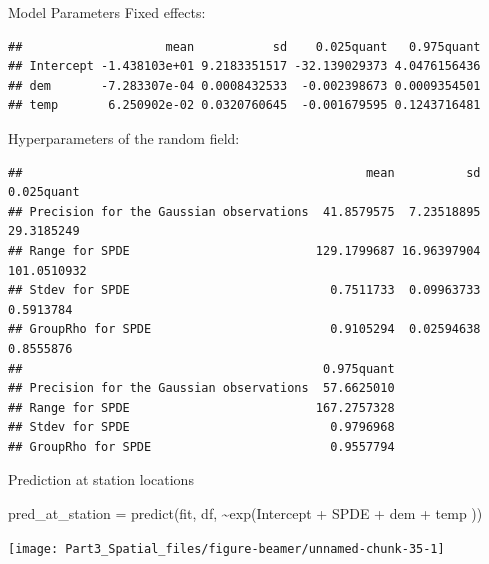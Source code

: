 \documentclass[
  ignorenonframetext,
]{beamer}
\newenvironment{Shaded}{\begin{snugshade}}{\end{snugshade}}
\newcommand{\FunctionTok}[1]{\textcolor[rgb]{0.00,0.00,0.00}{#1}}
\newcommand{\NormalTok}[1]{#1}
\newcommand{\OtherTok}[1]{\textcolor[rgb]{0.56,0.35,0.01}{#1}}
\newcommand{\SpecialCharTok}[1]{\textcolor[rgb]{0.00,0.00,0.00}{#1}}
\begin{document}
\begin{frame}[fragile]{Model Parameters}
\protect\hypertarget{model-parameters}{}
Fixed effects: \tiny

\begin{verbatim}
##                    mean           sd    0.025quant   0.975quant
## Intercept -1.438103e+01 9.2183351517 -32.139029373 4.0476156436
## dem       -7.283307e-04 0.0008432533  -0.002398673 0.0009354501
## temp       6.250902e-02 0.0320760645  -0.001679595 0.1243716481
\end{verbatim}

\normalsize

Hyperparameters of the random field: \tiny

\begin{verbatim}
##                                                mean          sd  0.025quant
## Precision for the Gaussian observations  41.8579575  7.23518895  29.3185249
## Range for SPDE                          129.1799687 16.96397904 101.0510932
## Stdev for SPDE                            0.7511733  0.09963733   0.5913784
## GroupRho for SPDE                         0.9105294  0.02594638   0.8555876
##                                          0.975quant
## Precision for the Gaussian observations  57.6625010
## Range for SPDE                          167.2757328
## Stdev for SPDE                            0.9796968
## GroupRho for SPDE                         0.9557794
\end{verbatim}
\end{frame}

\begin{frame}[fragile]{Prediction at station locations}
\protect\hypertarget{prediction-at-station-locations}{}
\small

\begin{Shaded}
\begin{Highlighting}[]
\NormalTok{pred\_at\_station }\OtherTok{=} \FunctionTok{predict}\NormalTok{(fit, df, }
                          \SpecialCharTok{\textasciitilde{}}\FunctionTok{exp}\NormalTok{(Intercept }\SpecialCharTok{+}\NormalTok{ SPDE }\SpecialCharTok{+}\NormalTok{ dem }\SpecialCharTok{+}\NormalTok{ temp ))}
\end{Highlighting}
\end{Shaded}

\normalsize

\begin{center}\texttt{[image: Part3\_Spatial\_files/figure-beamer/unnamed-chunk-35-1]} \end{center}
\end{frame}
\end{document}
